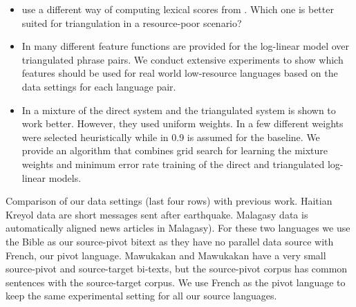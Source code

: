 \documentclass[11pt]{article}
\begin{document}
\begin{itemize}\addtolength{\itemsep}{-0.4\baselineskip}
	\item \cite{Utiyama:07} use a different way of computing lexical scores from \cite{Cohn:07}. Which one is better suited for triangulation in a resource-poor scenario?
	\item In \cite{Utiyama:07,Cohn:07,Nakovemnlp:12,Wuwang:07} many different feature functions are provided for the log-linear model over triangulated phrase pairs. We conduct extensive experiments to show which features should be used for real world low-resource languages based on the data settings for each language pair.
	\item In \cite{Cohn:07} a mixture of the direct system and the triangulated system is shown to work better. However, they used uniform weights. In \cite{Nakovemnlp:12} a few different weights were selected heuristically while in \cite{Wuwang:07} 0.9 is assumed for the baseline. We provide an algorithm that combines grid search for learning the mixture weights and minimum error rate training of the direct and triangulated log-linear models. 
\end{itemize}

\begin{table*}[!ht]
	\small
	\centering
	
	\caption{Comparison of our data settings (last four rows) with previous work. Haitian Kreyol data are short messages sent after earthquake. Malagasy data is automatically aligned news articles in Malagasy). For these two languages we use the Bible as our source-pivot bitext as they have no parallel data source with French, our pivot language. Mawukakan and Mawukakan have a very small source-pivot and source-target bi-texts, but the source-pivot corpus has common sentences with the source-target corpus. We use French as the pivot language to keep the same experimental setting for all our source languages.}
	\label{table:datasettings_differences}
\end{table*}
\end{document}

